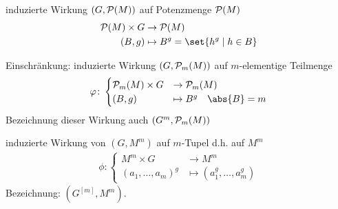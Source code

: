 \begin{example}\label{sec2:exm:actions}
	\begin{expenum}
		\item induzierte Wirkung $(G,\mathcal{P}(M))$ auf Potenzmenge $\mathcal{P}(M)$
		\begin{align*}
			\powerset(M) \times G &\to \powerset(M)\\
			(B,g) &\mapsto B^g = \set{h^g \mid h \in B} 
		\end{align*}\label{sec2:exm:action_a}
		\item Einschränkung: induzierte Wirkung $(G,\mathcal{P}_m(M))$ auf $m$-elementige Teilmenge
		\begin{align*}
			\phi\colon \begin{cases}
				\powerset_m(M) \times G &\to \powerset_m(M)\\
				(B,g) &\mapsto B^g \quad \abs{B} = m
			\end{cases}
		\end{align*}
		Bezeichnung dieser Wirkung auch $(G^{m}, \mathcal{P}_m(M))$ \label{sec2:exm:action_b}
		\item induzierte Wirkung von $(G,M^m)$ auf $m$-Tupel d.h. auf $M^m$
		\begin{align*}
			\phi \colon \begin{cases}
				M^m \times G &\to M^m\\
				(a_1, \dots, a_m)^g &\mapsto (a_1^g, \dots, a_m^g)
			\end{cases}
		\end{align*}
		Bezeichnung: $(G^{[m]}, M^m)$. \label{sec2:exm:action_c}
	\end{expenum}
\end{example}